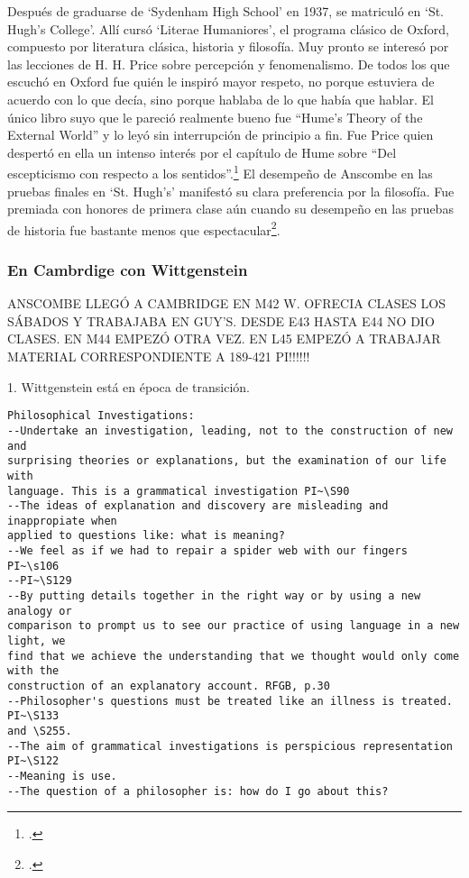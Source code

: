 Después de graduarse de `Sydenham High School' en 1937, se matriculó en `St.
Hugh's College'. Allí cursó `Literae Humaniores', el programa clásico de Oxford,
compuesto por literatura clásica, historia y filosofía. Muy pronto se interesó
por las lecciones de H. H. Price sobre percepción y fenomenalismo. De todos los
que escuchó en Oxford fue quién le inspiró mayor respeto, no porque estuviera de
acuerdo con lo que decía, sino porque hablaba de lo que había que hablar. El
único libro suyo que le pareció realmente bueno fue ``Hume's Theory of the
External World'' y lo leyó sin interrupción de principio a
fin. Fue Price quien despertó en ella un intenso interés por el capítulo de Hume
sobre ``Del escepticismo con respecto a los sentidos''.\footcite[cf.~][p.~viii
\S1]{M&PotM} El desempeño de Anscombe en las pruebas finales en `St. Hugh's'
manifestó su clara preferencia por la filosofía. Fue premiada con honores de
primera clase aún cuando su desempeño en las pruebas de historia fue bastante
menos que espectacular\footcite[p.~3~\S1]{teichmann}.

\subsubsection{En Cambrdige con Wittgenstein}
ANSCOMBE LLEGÓ A CAMBRIDGE EN M42 W. OFRECIA CLASES LOS SÁBADOS Y TRABAJABA EN
GUY'S. DESDE E43 HASTA E44 NO DIO CLASES. EN M44 EMPEZÓ OTRA VEZ. EN L45 EMPEZÓ
A TRABAJAR MATERIAL CORRESPONDIENTE A 189-421 PI!!!!!!

1. Wittgenstein está en época de transición.
\begin{verbatim}
Philosophical Investigations:
--Undertake an investigation, leading, not to the construction of new and
surprising theories or explanations, but the examination of our life with
language. This is a grammatical investigation PI~\S90 
--The ideas of explanation and discovery are misleading and inappropiate when
applied to questions like: what is meaning?
--We feel as if we had to repair a spider web with our fingers PI~\s106
--PI~\S129
--By putting details together in the right way or by using a new analogy or
comparison to prompt us to see our practice of using language in a new light, we
find that we achieve the understanding that we thought would only come with the
construction of an explanatory account. RFGB, p.30
--Philosopher's questions must be treated like an illness is treated. PI~\S133
and \S255.
--The aim of grammatical investigations is perspicious representation PI~\S122
--Meaning is use.
--The question of a philosopher is: how do I go about this?
\end{verbatim}


